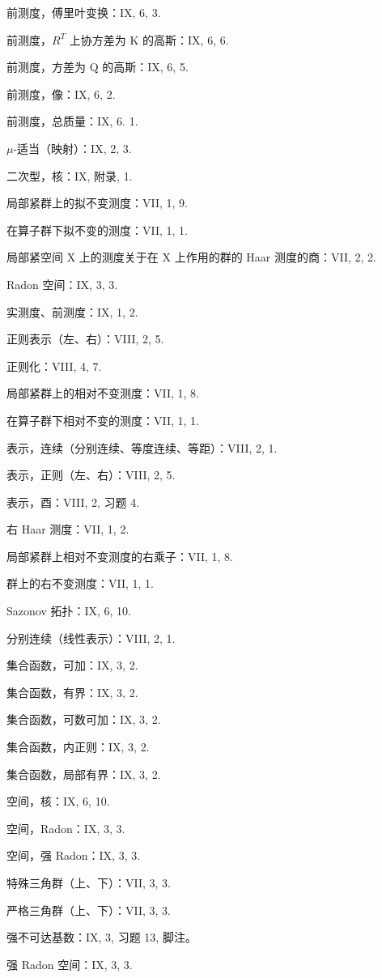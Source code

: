 前测度，傅里叶变换：IX, 6, 3.

前测度，\(R^{T}\) 上协方差为 K 的高斯：IX, 6, 6.

前测度，方差为 Q 的高斯：IX, 6, 5.

前测度，像：IX, 6, 2.

前测度，总质量：IX, 6. 1.

\(\mu\)-适当（映射）：IX, 2, 3.

二次型，核：IX, 附录, 1.

局部紧群上的拟不变测度：VII, 1, 9.

在算子群下拟不变的测度：VII, 1, 1.

局部紧空间 X 上的测度关于在 X 上作用的群的 Haar 测度的商：VII, 2, 2.

Radon 空间：IX, 3, 3.

实测度、前测度：IX, 1, 2.

正则表示（左、右）：VIII, 2, 5.

正则化：VIII, 4, 7.

局部紧群上的相对不变测度：VII, 1, 8.

在算子群下相对不变的测度：VII, 1, 1.

表示，连续（分别连续、等度连续、等距）：VIII, 2, 1.

表示，正则（左、右）：VIII, 2, 5.

表示，酉：VIII, 2, 习题 4.

右 Haar 测度：VII, 1, 2.

局部紧群上相对不变测度的右乘子：VII, 1, 8.

群上的右不变测度：VII, 1, 1.

Sazonov 拓扑：IX, 6, 10.

分别连续（线性表示）：VIII, 2, 1.

集合函数，可加：IX, 3, 2.

集合函数，有界：IX, 3, 2.

集合函数，可数可加：IX, 3, 2.

集合函数，内正则：IX, 3, 2.

集合函数，局部有界：IX, 3, 2.

空间，核：IX, 6, 10.

空间，Radon：IX, 3, 3.

空间，强 Radon：IX, 3, 3.

特殊三角群（上、下）：VII, 3, 3.

严格三角群（上、下）：VII, 3, 3.

强不可达基数：IX, 3, 习题 13, 脚注。

强 Radon 空间：IX, 3, 3.

